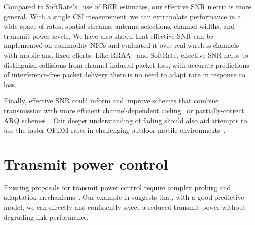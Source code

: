 Compared to SoftRate's~\cite{Vutukuru_SoftRate} use of BER estimates, our effective SNR metric is more general. With a single CSI measurement, we can extrapolate performance in a wide space of rates, spatial streams, antenna selections, channel widths, and transmit power levels. We have also shown that effective SNR can be implemented on commodity NICs and evaluated it over real wireless channels with mobile and fixed clients. Like RRAA~\cite{Wong_RRAA} and SoftRate, effective SNR helps to distinguish collisions from channel induced packet loss; with accurate predictions of interference-free packet delivery there is no need to adapt rate in response to loss.

Finally, effective SNR could inform and improve schemes that combine transmission with more efficient channel-dependent coding~\cite{Lin_ZipTX} or partially-correct ARQ schemes~\cite{Jamieson_PPR}. Our deeper understanding of fading should also aid attempts to use the faster OFDM rates in challenging outdoor mobile environments~\cite{Eriksson_Cabernet}. %

\section{Transmit power control}
Existing proposals for transmit power control require complex probing and adaptation mechanisms~\cite{Monks_PowerMAC,Ramachandran_Symphony,Son_PowerStudy}. Our %
example in  suggests 
that, with a good predictive model, we can directly and confidently select a reduced transmit power without degrading link performance. 

\ifx\mainfile\undefined

\fi
